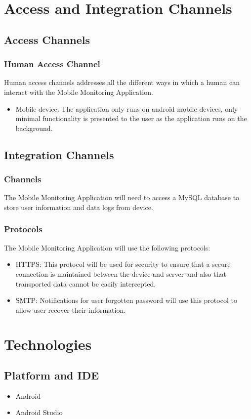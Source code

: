 \documentclass[hidelinks, 12pt, oneside]{article}
\begin{document}
	\section{Access and Integration Channels}
	\subsection{Access Channels}
	\subsubsection{Human Access Channel}
	Human access channels addresses all the different ways in which a human can interact with the Mobile Monitoring Application.
	\begin{itemize}
		\item Mobile device: The application only runs on android mobile devices, only minimal functionality is presented to the user as the application runs on the background.   
	\end{itemize}
	\subsection{Integration Channels}
	\subsubsection{Channels}
	The Mobile Monitoring Application will need to access a MySQL database to store user information and data logs from device.    	\subsubsection{Protocols}
	The Mobile Monitoring Application will use the following protocols:
	\begin{itemize}
	\item HTTPS: This protocol will be used for security to ensure that a secure connection is maintained between the device and server and also that transported data cannot be easily intercepted.
	\item SMTP: Notifications for user forgotten password will use this protocol to allow user recover their information.  
	\end{itemize}	 
	\newpage
	\section{Technologies}
	\subsection{Platform and IDE}
	\begin{itemize}
	\item Android
	\item Android Studio
	\end{itemize}
\end{document}
